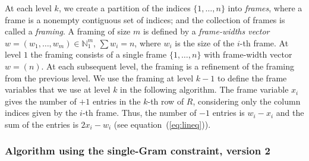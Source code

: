 \documentclass[11pt,a4paper]{article}
\newcommand{\pos}{\mathbb{N}_1}
\begin{document}
At each level $k$, we create a partition of the indices $\{1,\ldots,n\}$ into
\emph{frames}, where a frame is a nonempty contiguous set of indices; 
and the collection of frames is called a \emph{framing}.
A framing of size $m$ is defined by a \emph{frame-widths vector}
$w = (w_1,\ldots,w_m) \in \pos^m$, $\sum w_i = n$, where
$w_i$ is the size of the $i$-th frame.
At level $1$ the framing consists of a single frame $\{1,\ldots,n\}$ with
frame-width vector $w = (n)$.  At each subsequent level, the framing is a
{refinement} of the framing from the previous level.  We use the framing at
level $k-1$ to define the frame variables that we use at level $k$ in the
following algorithm. The frame variable
$x_i$ gives the number of $+1$ entries in the $k$-th row of $R$,
considering only the column indices given by the $i$-th frame.
Thus, the number of $-1$ entries is $w_i - x_i$ and the sum of the
entries is $2x_i - w_i$ (see equation~(\ref{eq:lineq})).

\newpage
\subsubsection*{Algorithm using the single-Gram constraint, version 2}
\end{document}
